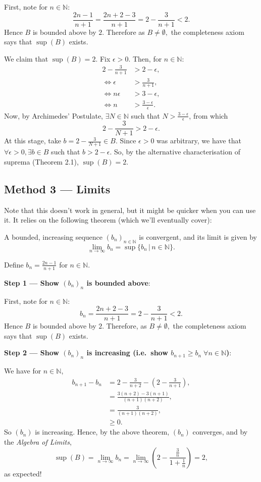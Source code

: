 \documentclass[
  10pt,
  a4paper]{article}
\theoremstyle{plain}
\theoremstyle{definition}
\theoremstyle{plain}
\theoremstyle{plain}
\theoremstyle{plain}
\theoremstyle{plain}
\theoremstyle{definition}
\theoremstyle{definition}
\newtheorem*{Order Axioms*}{Order Axioms}\newtheorem{Order Axioms}{Order Axioms}[section]
\theoremstyle{remark}
\theoremstyle{remark}
\let\BeginKnitrBlock\begin \let\EndKnitrBlock\end
\begin{document}
\BeginKnitrBlock{solution*}
First, note for \(n\in\mathbb{N}\): \[\frac{2n-1}{n+1} = \frac{2n+2-3}{n+1} = 2 - \frac{3}{n+1} < 2.\] Hence \(B\) is bounded above by \(2\). Therefore as \(B \neq \emptyset,\) the completeness axiom says that \(\sup(B)\) exists.

We claim that \(\sup(B) = 2.\) Fix \(\epsilon > 0.\) Then, for \(n \in \mathbb{N}:\)
\begin{align*}
2 - \frac{3}{n+1} &> 2-\epsilon,\\
\Leftrightarrow \epsilon &> \frac{3}{n+1},\\
\Leftrightarrow n\epsilon &> 3 - \epsilon,\\
\Leftrightarrow n &> \frac{3-\epsilon}{\epsilon}.
\end{align*}
Now, by Archimedes' Postulate, \(\exists N \in \mathbb{N}\) such that \(N > \frac{3-\epsilon}{\epsilon}\), from which \[2 - \frac{3}{N+1} > 2- \epsilon.\] At this stage, take \(b = 2 - \frac{3}{N+1} \in B\). Since \(\epsilon > 0\) was arbitrary, we have that \(\forall \epsilon > 0, \exists b \in B\) such that \(b > 2-\epsilon.\) So, by the alternative characterisation of suprema (Theorem 2.1), \(\sup(B) = 2.\)
\EndKnitrBlock{solution*}

\hypertarget{method-3-limits}{%
\subsection*{Method 3 --- Limits}\label{method-3-limits}}

Note that this doesn't work in general, but it might be quicker when you can use it. It relies on the following theorem (which we'll eventually cover):
\BeginKnitrBlock{theorem}
{\label{thm:unnamed-chunk-5} }A bounded, increasing sequence \((b_n)_{n \in \mathbb{N}}\) is convergent, and its limit is given by \[\lim_{n \to \infty} b_n = \sup\lbrace b_n \,\lvert\, n \in \mathbb{N} \rbrace.\]
\EndKnitrBlock{theorem}

\BeginKnitrBlock{solution*}
Define \(b_n = \frac{2n - 1}{n+1}\) for \(n \in \mathbb{N}\).

\textbf{Step 1 --- Show \((b_n)_n\) is bounded above}:

First, note for \(n\in\mathbb{N}\): \[b_n = \frac{2n+2-3}{n+1} = 2 - \frac{3}{n+1} < 2.\] Hence \(B\) is bounded above by \(2\). Therefore, as \(B \neq \emptyset,\) the completeness axiom says that \(\sup(B)\) exists.

\textbf{Step 2 --- Show \((b_n)_n\) is increasing (i.e.~show \(b_{n+1} \geq b_n \; \forall n \in \mathbb{N}\))}:

We have for \(n \in \mathbb{N}\),
\begin{align*}
b_{n+1} - b_{n} &= 2 - \frac{3}{n+2} - \left(2 - \frac{3}{n+1}\right),\\
&= \frac{3(n+2)-3(n+1)}{(n+1)(n+2)},\\
&= \frac{3}{(n+1)(n+2)},\\
&\geq 0.
\end{align*}
So \((b_n)\) is increasing. Hence, by the above theorem, \((b_n)\) converges, and by the \emph{Algebra of Limits}, \[\sup(B) = \lim_{n \to \infty} b_n = \lim_{n \to \infty} \left(2 - \frac{\frac{3}{n}}{1 + \frac{1}{n}}\right) = 2,\]
as expected!
\EndKnitrBlock{solution*}
\end{document}
